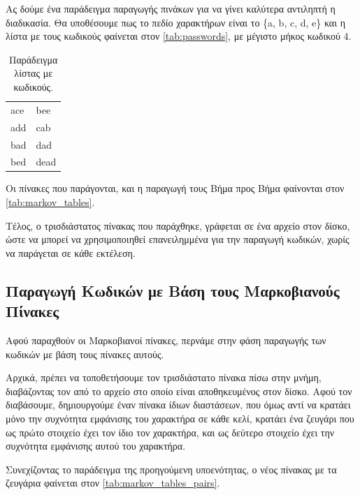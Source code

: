 \documentclass[11pt]{article}
\newenvironment{alltt}{\ttfamily}{\rmfamily}
\begin{document}
Ας δούμε ένα παράδειγμα παραγωγής πινάκων για να γίνει καλύτερα αντιληπτή η διαδικασία. Θα υποθέσουμε πως το πεδίο χαρακτήρων είναι το \{a, b, c, d, e\} και η λίστα με τους κωδικούς φαίνεται στον \autoref{tab:passwords}, με μέγιστο μήκος κωδικού 4.

\begin{table}[h]
    \centering
    \begin{alltt}
        \begin{tabular}{ll}
                ace & bee \\
                add & cab \\
                bad & dad \\
                bed & dead \\
        \end{tabular}
    \end{alltt}
    \caption{Παράδειγμα λίστας με κωδικούς. \label{tab:passwords}}
\end{table}

Οι πίνακες που παράγονται, και η παραγωγή τους Βήμα προς Βήμα φαίνονται στον \autoref{tab:markov_tables}.



Τέλος, ο τρισδιάστατος πίνακας που παράχθηκε, γράφεται σε ένα αρχείο στον δίσκο, ώστε να μπορεί να χρησιμοποιηθεί επανειλημμένα για την παραγωγή κωδικών, χωρίς να παράγεται σε κάθε εκτέλεση.

\subsection{Παραγωγή Κωδικών με Βάση τους Μαρκοβιανούς Πίνακες}

Αφού παραχθούν οι Μαρκοβιανοί πίνακες, περνάμε στην φάση παραγωγής των κωδικών με βάση τους πίνακες αυτούς.

Αρχικά, πρέπει να τοποθετήσουμε τον τρισδιάστατο πίνακα πίσω στην μνήμη, διαβάζοντας τον από το αρχείο στο οποίο είναι αποθηκευμένος στον δίσκο. Αφού τον διαβάσουμε, δημιουργούμε έναν πίνακα ίδιων διαστάσεων, που όμως αντί να κρατάει μόνο την συχνότητα εμφάνισης του χαρακτήρα σε κάθε κελί, κρατάει ένα ζευγάρι που ως πρώτο στοιχείο έχει τον ίδιο τον χαρακτήρα, και ως δεύτερο στοιχείο έχει την συχνότητα εμφάνισης αυτού του χαρακτήρα.

Συνεχίζοντας το παράδειγμα της προηγούμενη υποενότητας, ο νέος πίνακας με τα ζευγάρια φαίνεται στον \autoref{tab:markov_tables_pairs}.


\end{document}
